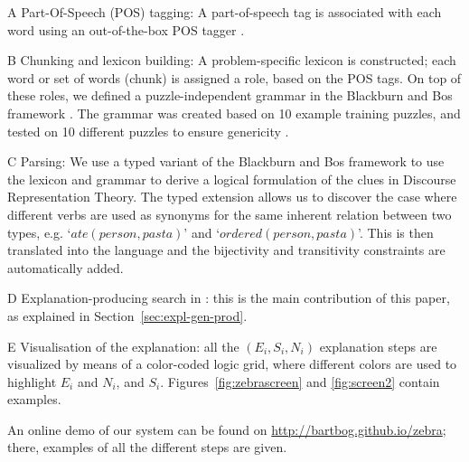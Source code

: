 \begin{compactenum}
	\item[A] Part-Of-Speech (POS) tagging: A part-of-speech tag is associated with each word using an out-of-the-box POS tagger \cite{DBLP:journals/coling/MarcusSM94}.
	\item[B] Chunking and lexicon building: A problem-specific lexicon is constructed; each word or set of words (chunk) is assigned a role, based on the POS tags. On top of these roles, we defined a puzzle-independent grammar in the Blackburn and Bos framework \cite{Blackburn2005,Blackburn2006}. The grammar was created based on 10 example training puzzles, and tested on 10 different puzzles to ensure genericity \cite{msc/Claes17}. 
	\item[C] Parsing: We use a typed variant of the Blackburn and Bos framework to use the lexicon and grammar to derive a logical formulation of the clues in Discourse Representation Theory. The typed extension allows us to discover the case where different verbs are used as synonyms for the same inherent relation between two types, e.g. `$ate(person, pasta)$' and `$ordered(person, pasta)$'. This is then translated into the \idp language and the bijectivity and transitivity constraints are automatically added. 
	\item[D] Explanation-producing search in \idp: this is the main contribution of this paper, as explained in Section~\ref{sec:expl-gen-prod}.
	\item[E] Visualisation of the explanation: all the $(E_i, S_i, N_i)$ explanation steps are visualized by means of a color-coded logic grid, where different colors are used to highlight $E_i$ and $N_i$, and $S_i$. Figures~\ref{fig:zebrascreen} and \ref{fig:screen2} contain examples.
\end{compactenum}

 An online demo of our system can be found on \url{http://bartbog.github.io/zebra}; there, examples of all the different steps are given. 

